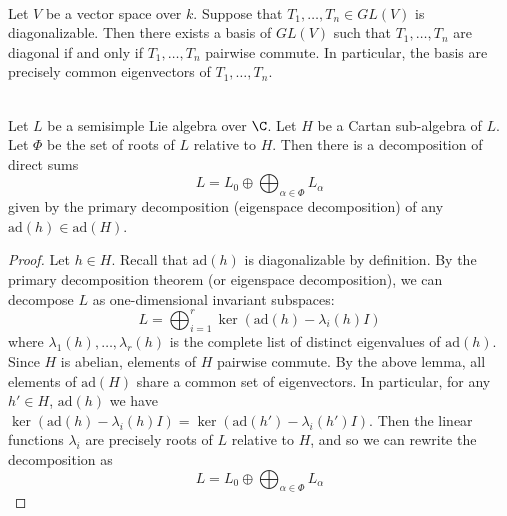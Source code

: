 \documentclass[a4paper]{article}
\begin{document}
\begin{lmm}{}{} \\Let $V$ be a vector space over $k$. Suppose that $T_1,\dots,T_n\in GL(V)$ is diagonalizable. Then there exists a basis of $GL(V)$ such that $T_1,\dots,T_n$ are diagonal if and only if $T_1,\dots,T_n$ pairwise commute. In particular, the basis are precisely common eigenvectors of $T_1,\dots,T_n$. 
\end{lmm}

\begin{lmm}{}{} \\Let $L$ be a semisimple Lie algebra over $\C$. Let $H$ be a Cartan sub-algebra of $L$. Let $\Phi$ be the set of roots of $L$ relative to $H$. Then there is a decomposition of direct sums $$L=L_0\oplus\bigoplus_{\alpha\in\Phi}L_\alpha$$ given by the primary decomposition (eigenspace decomposition) of any $\text{ad}(h)\in\text{ad}(H)$. 
\begin{proof}
Let $h\in H$. Recall that $\text{ad}(h)$ is diagonalizable by definition. By the primary decomposition theorem (or eigenspace decomposition), we can decompose $L$ as one-dimensional invariant subspaces: $$L=\bigoplus_{i=1}^r\ker(\text{ad}(h)-\lambda_i(h)I)$$ where $\lambda_1(h),\dots,\lambda_r(h)$ is the complete list of distinct eigenvalues of $\text{ad}(h)$. \\

Since $H$ is abelian, elements of $H$ pairwise commute. By the above lemma, all elements of $\text{ad}(H)$ share a common set of eigenvectors. In particular, for any $h'\in H$, $\text{ad}(h)$ we have $\ker(\text{ad}(h)-\lambda_i(h)I)=\ker(\text{ad}(h')-\lambda_i(h')I)$. Then the linear functions $\lambda_i$ are precisely roots of $L$ relative to $H$, and so we can rewrite the decomposition as $$L=L_0\oplus\bigoplus_{\alpha\in\Phi}L_\alpha$$
\end{proof}
\end{lmm}
\end{document}
